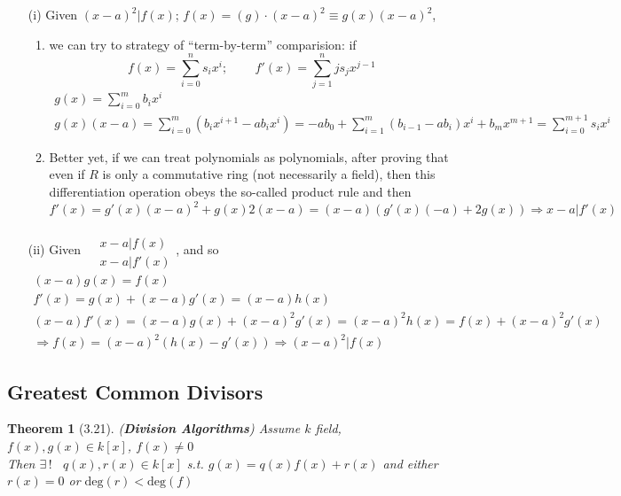 \documentclass[twoside,landscape]{amsart}
\theoremstyle{plain}
\newtheorem{theorem}{Theorem}
\theoremstyle{definition}
\theoremstyle{remark}
\begin{document}
\begin{multicols*}{2}
\begin{enumerate}
\item[(i)] Given $(x-a)^2 | f(x)$; $f(x) = (g)\cdot (x-a)^2 \equiv g(x) (x-a)^2$,
  \begin{enumerate}
  \item  we can try to strategy of ``term-by-term'' comparision: if
    \[
f(x) = \sum_{i=0}^n s_ix^i ; \qquad \, f'(x) = \sum_{j=1}^n js_j x^{j-1} 
\]
\[
\begin{gathered}
  g(x) = \sum_{i=0}^m b_ix^i \\
  g(x)(x-a) = \sum_{i=0}^m (b_i x^{i+1} - ab_i x^i ) = -ab_0 + \sum_{i=1}^m (b_{i-1} - ab_i) x^i + b_m x^{m+1} = \sum_{i=0}^{m+1} s_i x^i
\end{gathered}
\]
\item Better yet, if we can treat polynomials as polynomials, after proving that even if $R$ is only a commutative ring (not necessarily a field), then this differentiation operation obeys the so-called product rule and then
  \[
f'(x) = g'(x) (x-a)^2 + g(x) 2(x-a) = (x-a) (g'(x)(-a) + 2g(x)) \Longrightarrow \boxed{ x-a | f'(x) }
  \]
\end{enumerate}
\item[(ii)] Given $\begin{aligned} & \quad \\
  & x - a | f(x) \\
  & x-a | f'(x) \end{aligned}$, and so
  \[
\begin{gathered}
  (x-a)g(x) = f(x) \\ 
  f'(x) = g(x) + (x-a) g'(x) = (x-a)h(x) \\
  (x-a)f'(x) = (x-a)g(x) + (x-a)^2 g'(x) = (x-a)^2 h(x) = f(x) + (x-a)^2 g'(x) \\
  \Longrightarrow f(x) = (x-a)^2 (h(x) -g'(x)) \Longrightarrow \boxed{ (x-a)^2 | f(x) }
\end{gathered}
  \]
  \end{enumerate}

\subsection{ Greatest Common Divisors }

\begin{theorem}[3.21] (\textbf{Division Algorithms})
  Assume $k$ field, $f(x),g(x) \in k[x]$, $f(x)\neq 0$ \\
Then $\exists \, !$ \, $q(x),r(x) \in k[x]$ s.t. $g(x) = q(x)f(x) + r(x)$ and either $r(x)=0$ or $\text{deg}(r) < \text{deg}(f)$
\end{theorem}


\end{multicols*}
\end{document}
